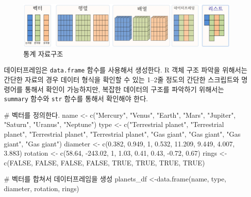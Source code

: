 \documentclass[
  letterpaper,
  chapter,a4paper,showtrims,openright,hidelinks]{oblivoir}
\newenvironment{Shaded}{\begin{snugshade}}{\end{snugshade}}
\newcommand{\CommentTok}[1]{\textcolor[rgb]{0.37,0.37,0.37}{#1}}
\newcommand{\ConstantTok}[1]{\textcolor[rgb]{0.56,0.35,0.01}{#1}}
\newcommand{\DecValTok}[1]{\textcolor[rgb]{0.68,0.00,0.00}{#1}}
\newcommand{\FloatTok}[1]{\textcolor[rgb]{0.68,0.00,0.00}{#1}}
\newcommand{\FunctionTok}[1]{\textcolor[rgb]{0.28,0.35,0.67}{#1}}
\newcommand{\NormalTok}[1]{\textcolor[rgb]{0.00,0.23,0.31}{#1}}
\newcommand{\OtherTok}[1]{\textcolor[rgb]{0.00,0.23,0.31}{#1}}
\newcommand{\SpecialCharTok}[1]{\textcolor[rgb]{0.37,0.37,0.37}{#1}}
\newcommand{\StringTok}[1]{\textcolor[rgb]{0.13,0.47,0.30}{#1}}
\begin{document}
\begin{figure}

{\centering \includegraphics{images/data_structure.jpg}

}

\caption{통계 자료구조}

\end{figure}

데이터프레임은 \texttt{data.frame} 함수를 사용해서 생성한다. R 객체 구조
파악을 위해서는 간단한 자료의 경우 데이터 형식을 확인할 수 있는 1--2줄
정도의 간단한 스크립트와 명령어를 통해서 확인이 가능하지만, 복잡한
데이터의 구조를 파악하기 위해서는 \texttt{summary} 함수와 \texttt{str}
함수를 통해서 확인해야 한다.

\begin{Shaded}
\begin{Highlighting}[]
\CommentTok{\# 벡터를 정의한다.}
\NormalTok{name }\OtherTok{\textless{}{-}} \FunctionTok{c}\NormalTok{(}\StringTok{"Mercury"}\NormalTok{, }\StringTok{"Venus"}\NormalTok{, }\StringTok{"Earth"}\NormalTok{, }\StringTok{"Mars"}\NormalTok{, }\StringTok{"Jupiter"}\NormalTok{, }\StringTok{"Saturn"}\NormalTok{, }\StringTok{"Uranus"}\NormalTok{, }\StringTok{"Neptune"}\NormalTok{)}
\NormalTok{type }\OtherTok{\textless{}{-}} \FunctionTok{c}\NormalTok{(}\StringTok{"Terrestrial planet"}\NormalTok{, }\StringTok{"Terrestrial planet"}\NormalTok{, }\StringTok{"Terrestrial planet"}\NormalTok{, }
          \StringTok{"Terrestrial planet"}\NormalTok{, }\StringTok{"Gas giant"}\NormalTok{, }\StringTok{"Gas giant"}\NormalTok{, }\StringTok{"Gas giant"}\NormalTok{, }\StringTok{"Gas giant"}\NormalTok{)}
\NormalTok{diameter }\OtherTok{\textless{}{-}} \FunctionTok{c}\NormalTok{(}\FloatTok{0.382}\NormalTok{, }\FloatTok{0.949}\NormalTok{, }\DecValTok{1}\NormalTok{, }\FloatTok{0.532}\NormalTok{, }\FloatTok{11.209}\NormalTok{, }\FloatTok{9.449}\NormalTok{, }\FloatTok{4.007}\NormalTok{, }\FloatTok{3.883}\NormalTok{)}
\NormalTok{rotation }\OtherTok{\textless{}{-}} \FunctionTok{c}\NormalTok{(}\FloatTok{58.64}\NormalTok{, }\SpecialCharTok{{-}}\FloatTok{243.02}\NormalTok{, }\DecValTok{1}\NormalTok{, }\FloatTok{1.03}\NormalTok{, }\FloatTok{0.41}\NormalTok{, }\FloatTok{0.43}\NormalTok{, }\SpecialCharTok{{-}}\FloatTok{0.72}\NormalTok{, }\FloatTok{0.67}\NormalTok{)}
\NormalTok{rings }\OtherTok{\textless{}{-}} \FunctionTok{c}\NormalTok{(}\ConstantTok{FALSE}\NormalTok{, }\ConstantTok{FALSE}\NormalTok{, }\ConstantTok{FALSE}\NormalTok{, }\ConstantTok{FALSE}\NormalTok{, }\ConstantTok{TRUE}\NormalTok{, }\ConstantTok{TRUE}\NormalTok{, }\ConstantTok{TRUE}\NormalTok{, }\ConstantTok{TRUE}\NormalTok{)}

\CommentTok{\# 벡터를 합쳐서 데이터프레임을 생성}
\NormalTok{planets\_df }\OtherTok{\textless{}{-}}\FunctionTok{data.frame}\NormalTok{(name, type, diameter, rotation, rings)}
\end{Highlighting}
\end{Shaded}
\end{document}
